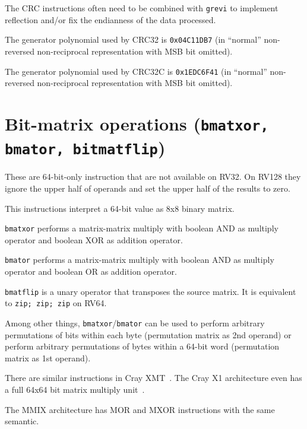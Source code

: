 The CRC instructions often need to be combined with \texttt{grevi} to implement reflection
and/or fix the endianness of the data processed.

The generator polynomial used by CRC32 is \texttt{0x04C11DB7} (in ``normal''
non-reversed non-reciprocal representation with MSB bit omitted).

The generator polynomial used by CRC32C is \texttt{0x1EDC6F41} (in ``normal''
non-reversed non-reciprocal representation with MSB bit omitted).


\section{Bit-matrix operations (\texttt{bmatxor, bmator, bitmatflip})}

These are 64-bit-only instruction that are not available on RV32. On RV128 they
ignore the upper half of operands and set the upper half of the results to zero.

This instructions interpret a 64-bit value as 8x8 binary matrix.

\texttt{bmatxor} performs a matrix-matrix multiply with boolean AND as multiply
operator and boolean XOR as addition operator.

\texttt{bmator} performs a matrix-matrix multiply with boolean AND as multiply
operator and boolean OR as addition operator.

\texttt{bmatflip} is a unary operator that transposes the source matrix. It is
equivalent to \texttt{zip; zip; zip} on RV64.

Among other things, \texttt{bmatxor}/\texttt{bmator} can be used to perform
arbitrary permutations of bits within each byte (permutation matrix as 2nd
operand) or perform arbitrary permutations of bytes within a 64-bit word
(permutation matrix as 1st operand).

There are similar instructions in Cray XMT~\cite{CrayXMT}. The Cray X1
architecture even has a full 64x64 bit matrix multiply unit~\cite{CrayX1}.

The MMIX architecture has MOR and MXOR instructions with the same semantic.~\cite[p.~182f]{Knuth4A}


